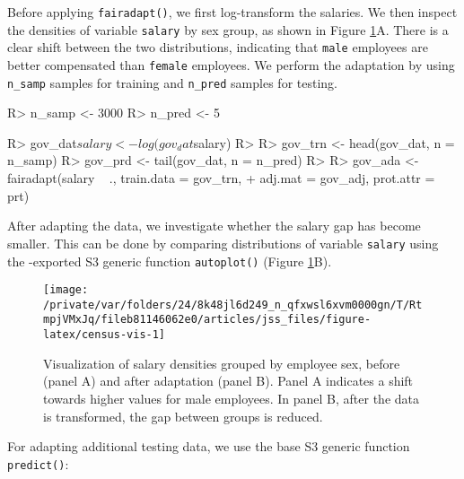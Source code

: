 \documentclass[
  nojss]{jss}
\begin{document}
Before applying \texttt{fairadapt()}, we first log-transform the
salaries. We then inspect the densities of variable \texttt{salary} by
sex group, as shown in Figure \ref{fig:census-vis}A. There is a clear
shift between the two distributions, indicating that \texttt{male}
employees are better compensated than \texttt{female} employees. We
perform the adaptation by using \texttt{n\_samp} samples for training
and \texttt{n\_pred} samples for testing.

\begin{CodeChunk}
\begin{CodeInput}
R> n_samp <- 3000
R> n_pred <- 5
\end{CodeInput}
\end{CodeChunk}

\begin{CodeChunk}
\begin{CodeInput}
R> gov_dat$salary <- log(gov_dat$salary)
R> 
R> gov_trn <- head(gov_dat, n = n_samp)
R> gov_prd <- tail(gov_dat, n = n_pred)
R> 
R> gov_ada <- fairadapt(salary ~ ., train.data = gov_trn,
+                      adj.mat = gov_adj, prot.attr = prt)
\end{CodeInput}
\end{CodeChunk}

After adapting the data, we investigate whether the salary gap has
become smaller. This can be done by comparing distributions of variable
\texttt{salary} using the -exported S3 generic function
\texttt{autoplot()} (Figure \ref{fig:census-vis}B).

\begin{CodeChunk}
\begin{figure}

{\centering \texttt{[image: /private/var/folders/24/8k48jl6d249\_n\_qfxwsl6xvm0000gn/T/RtmpjVMxJq/fileb81146062e0/articles/jss\_files/figure-latex/census-vis-1]} 

}

\caption[Visualization of salary densities grouped by employee sex, before (panel A) and after adaptation (panel B)]{Visualization of salary densities grouped by employee sex, before (panel A) and after adaptation (panel B). Panel A indicates a shift towards higher values for male employees. In panel B, after the data is transformed, the gap between groups is reduced.}\label{fig:census-vis}
\end{figure}
\end{CodeChunk}

For adapting additional testing data, we use the base  S3
generic function \texttt{predict()}:
\end{document}
